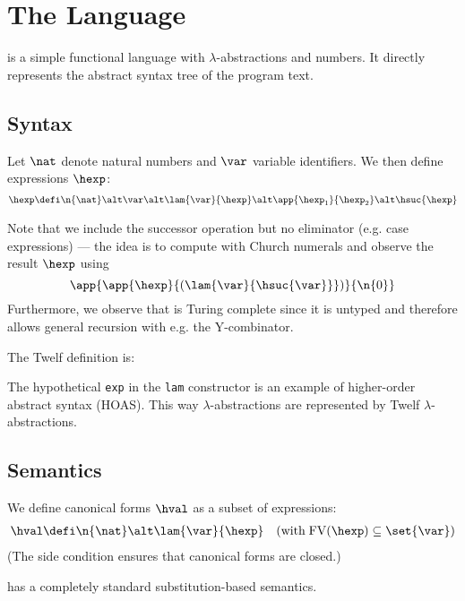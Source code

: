 \section{The \textnormal{\hlang} Language}

\hlang is a simple functional language with $\lambda$-abstractions and numbers.
It directly represents the abstract syntax tree of the program text.


\subsection{Syntax}

Let $\nat$ denote natural numbers and $\var$ variable identifiers. We then define \hlang expressions $\hexp$:
\begin{align*}
  \hexp &\defi \n{\nat} \alt \var \alt \lam{\var}{\hexp} \alt \app{\hexp_1}{\hexp_2} \alt \hsuc{\hexp} \\
\end{align*}

Note that we include the successor operation but no eliminator (e.g. case expressions) --- the idea is to compute with Church numerals and observe the result $\hexp$ using
\[
\app{\app{\hexp}{(\lam{\var}{\hsuc{\var}}})}{\n{0}}
\]
Furthermore, we observe that \hlang is Turing complete since it is untyped and therefore allows general recursion with e.g. the Y-combinator.

\Twelf
The Twelf definition is:

The hypothetical \texttt{exp} in the \texttt{lam} constructor is an example of higher-order abstract syntax (HOAS).
This way \hlang $\lambda$-abstractions are represented by Twelf $\lambda$-abstractions.


\subsection{Semantics}

We define canonical forms $\hval$ as a subset of expressions:
\begin{align*}
  \hval &\defi \n{\nat} \alt \lam{\var}{\hexp} \quad (\text{with} \; \mathrm{FV}(\hexp) \subseteq \set{\var}) \\
\end{align*}
(The side condition ensures that canonical forms are closed.)

\hlang has a completely standard substitution-based semantics.



